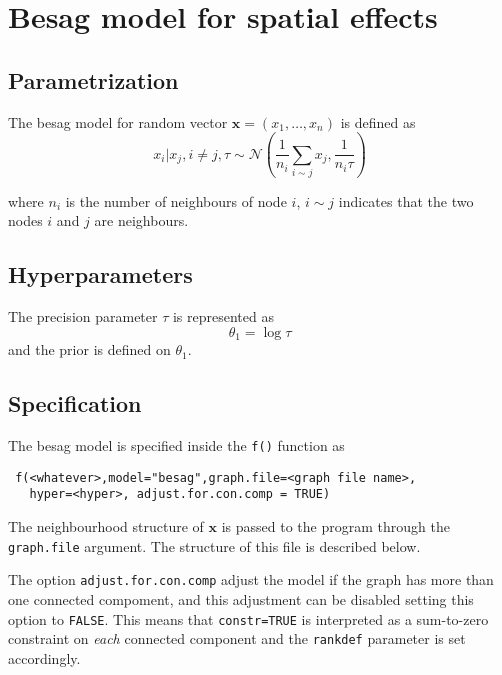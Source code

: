\documentclass[a4paper,11pt]{article}
\begin{document}
\section*{Besag model for spatial effects}

\subsection*{Parametrization}

The besag model for random vector $\mathbf{x}=(x_1,\dots,x_n)$ is defined as
\begin{equation}\label{eq.besag}
    x_i|x_j,i\neq j,\tau\sim\mathcal{N}(\frac{1}{n_i}\sum_{i\sim j}x_j,\frac{1}{n_i\tau})
\end{equation}

where $n_i$ is the number of neighbours of node $i$, $i\sim j$
indicates that the two nodes $i$ and $j$ are neighbours.  


\subsection*{Hyperparameters}

The precision parameter $\tau$ is represented as
\begin{displaymath}
    \theta_{1} =\log \tau
\end{displaymath}
and the prior is defined on $\theta_{1}$. 

\subsection*{Specification}

The besag model is specified inside the {\tt f()} function as
\begin{verbatim}
 f(<whatever>,model="besag",graph.file=<graph file name>,
   hyper=<hyper>, adjust.for.con.comp = TRUE)
\end{verbatim}

The neighbourhood structure of $\mathbf{x}$ is passed to the program
through the {\tt graph.file} argument.  The structure of this file is
described below.

The option \verb|adjust.for.con.comp| adjust the model if the graph
has more than one connected compoment, and this adjustment can be
disabled setting this option to \texttt{FALSE}. This means that
\texttt{constr=TRUE} is interpreted as a sum-to-zero constraint on
\emph{each} connected component and the \texttt{rankdef} parameter is
set accordingly. 
\end{document}
